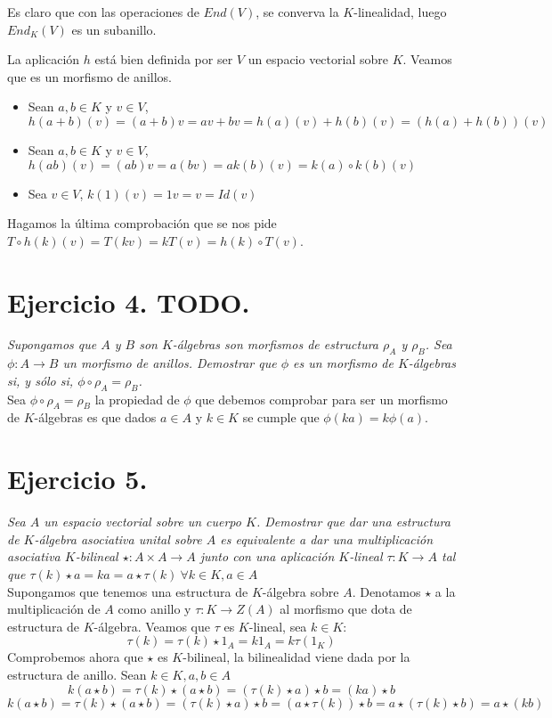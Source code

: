 \documentclass[UTF8]{article}
\begin{document}
Es claro que con las operaciones de \(End(V)\), se converva la \(K\)-linealidad,
luego \(End_K(V)\) es un subanillo.

La aplicación \(h\) está bien definida por ser \(V\) un espacio vectorial sobre
\(K\). Veamos que es un morfismo de anillos.
\begin{itemize}
\item Sean \(a,b \in K\) y \(v \in V\), \(h(a + b)(v) = (a+b)v = av + bv =
  h(a)(v) + h(b)(v) = (h(a) + h(b))(v) \)
\item Sean \(a,b \in K\) y \(v \in V\), \(h(ab)(v) = (ab)v = a(bv) =
  ak(b)(v) = k(a)\circ k(b) (v) \)
\item Sea \(v \in V\), \(k(1)(v) = 1v = v = Id(v)\)
\end{itemize}

Hagamos la última comprobación que se nos pide \(T \circ h(k) (v) = T(kv) =
kT(v) = h(k) \circ T (v)\).

\section{Ejercicio 4. TODO.} \emph{Supongamos que \(A\) y \(B\) son \(K\)-álgebras son
morfismos de estructura \(\rho_A\) y \(\rho_B\). Sea \( \phi:A \to B\) un morfismo
de anillos. Demostrar que \(\phi\) es un morfismo de \(K\)-álgebras si, y sólo si,
\(\phi \circ \rho_A = \rho_B\).} \\

Sea \(\phi \circ \rho_A = \rho_B\) la propiedad de \(\phi\) que debemos
comprobar para ser un morfismo de \(K\)-álgebras es que dados \(a
\in A \)  y \(k \in K \) se cumple que \(\phi(ka) = k\phi(a)\).

\section{Ejercicio 5.} \emph{Sea \(A\) un espacio vectorial sobre un cuerpo
  \(K\). Demostrar que dar una estructura de \(K\)-álgebra asociativa unital
  sobre \(A\) es equivalente a dar una multiplicación asociativa \(K\)-bilineal \(\star :A
  \times A \to A\) junto con una aplicación \(K\)-lineal \(\tau : K \to A\) tal
  que \(\tau(k)\star a = ka = a \star \tau(k) \ \forall k \in K, a \in A\)}\\

Supongamos que tenemos una estructura de \(K\)-álgebra sobre \(A\). Denotamos \(\star\) a la
multiplicación de \(A\) como anillo y \(\tau :K \to Z(A)\) al morfismo que dota
de estructura de \(K\)-álgebra.
 Veamos que \(\tau\) es \(K\)-lineal, sea \(k \in K\):
\[
\tau(k) = \tau(k) \star 1_A = k1_A = k \tau(1_K)
\]
Comprobemos ahora que \(\star\) es \(K\)-bilineal, la bilinealidad viene dada
por la estructura de anillo. Sean \(k \in K, a,b \in A\)
\[
k(a \star b) = \tau(k) \star (a \star b) = (\tau(k) \star a) \star b = (ka)
\star b
\]
\[
k(a \star b) = \tau(k) \star (a \star b) = (\tau(k) \star a) \star b = (a \star
\tau(k)) \star b = a \star (\tau(k) \star b) = a \star (kb)
\]
\end{document}
